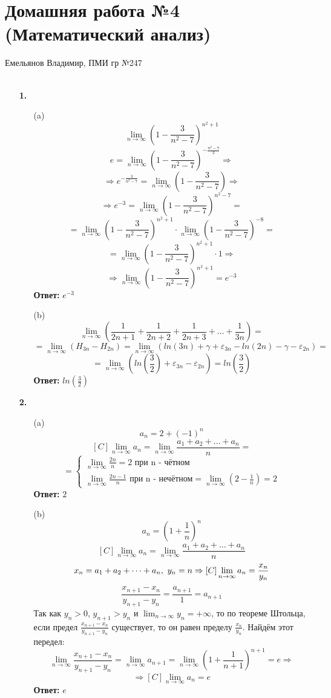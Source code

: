\documentclass[a4paper]{article}
\renewcommand{\f}[2]{\frac{#1}{#2}}
\newcommand{\case}[1]{\begin{cases} #1 \end{cases}}
\newcommand{\ts}{\text{\space}}
\renewcommand{\r}{\Rightarrow}
\begin{document}
\section*{Домашняя работа №4 (Математический анализ)}
{\large Емельянов Владимир, ПМИ гр №247}\\\\
\begin{enumerate}
    \item[\textbf{1.}]
    \begin{enumerate}
        \item[(a)]
        $$\lim_{n \to \infty}(1- \f{3}{n^2-7})^{n^2+1}$$
        $$e = \lim_{n \to \infty}(1 - \f{3}{n^2-7})^{-\f{n^2-7}{3}}\r$$
        $$\r e^{-\f{3}{n^2-7}} = \lim_{n \to \infty}(1 - \f{3}{n^2-7}) \r $$
        $$\r e^{-3} = \lim_{n \to \infty}(1 - \f{3}{n^2-7})^{n^2-7}=$$
        $$=\lim_{n \to \infty}(1 - \f{3}{n^2-7})^{n^2+1}\cdot \lim_{n \to \infty}(1 - \f{3}{n^2-7})^{-8} = $$
        $$= \lim_{n \to \infty}(1 - \f{3}{n^2-7})^{n^2+1}\cdot 1 \r$$
        $$\r \lim_{n \to \infty}(1- \f{3}{n^2-7})^{n^2+1} = e^{-3}$$
        \textbf{Ответ: } $e^{-3}$

        \item[(b)]
        $$\lim_{n \to \infty} ( \f{1}{2n + 1} + \f{1}{2n + 2} + \f{1}{2n + 3} + \dots + \f{1}{3n}) = $$
        $$= \lim_{n \to \infty}(H_{3n} - H_{2n}) = \lim_{n \to \infty}(ln(3n) + \gamma + \varepsilon_{3n} - ln(2n) - \gamma - \varepsilon_{2n}) = $$
        $$= \lim_{n \to \infty}(ln(\f{3}{2}) + \varepsilon_{3n}-\varepsilon_{2n}) = ln(\f{3}{2})$$
        \textbf{Ответ: } $ln(\f{3}{2})$
    \end{enumerate}

    \item[\textbf{2.}]
    \begin{enumerate}
        \item[(a)]
        $$a_n = 2 + (-1)^n$$
        $$[C]\lim_{n \to \infty} a_n = \lim_{n \to \infty} \f{a_1 + a_2 + \dots + a_n}{n} = $$
        $$=\case{
            \lim_{n \to \infty}\f{2n}{n} = 2 \text{ при n - чётном} \\
            \lim_{n \to \infty}\f{2n-1}{n} \text{ при n - нечётном} = \lim_{n \to \infty}(2-\f{1}{n}) = 2
        }$$
        \textbf{Ответ: } $2$

        \item[(b)]
        $$a_n = (1+\f{1}{n})^n$$
        $$[C]\lim_{n \to \infty} a_n  = \lim_{n \to \infty} \f{a_1 + a_2 + \dots + a_n}{n}$$
        $$x_n = a_1 + a_2 + \dots + a_n,\ts y_n = n \r [C]\lim_{n \to \infty} a_n = \f{x_n}{y_n}$$
        $$\f{x_{n+1} - x_n}{y_{n+1}-y_n} = \f{a_{n+1}}{1} = a_{n+1}$$
        Так как $y_n>0$, $y_{n+1}>y_n$ и $\lim_{n \to \infty}y_n = +\infty$, то по теореме Штольца, если предел $\f{x_{n+1}-x_{n}}{y_{n+1} - y_{n}}$ существует, то он равен пределу $\f{x_n}{y_n}$. Найдём этот передел:
        $$\lim_{n \to \infty}\f{x_{n+1} - x_n}{y_{n+1}-y_n} = \lim_{n \to \infty} a_{n+1} = \lim_{n \to \infty} (1+\f{1}{n+1})^{n+1} = e \r $$
        $$\r [C]\lim_{n \to \infty} a_n = e $$
        \textbf{Ответ: } $e$
        

\end{enumerate}
\end{enumerate}
\end{document}
